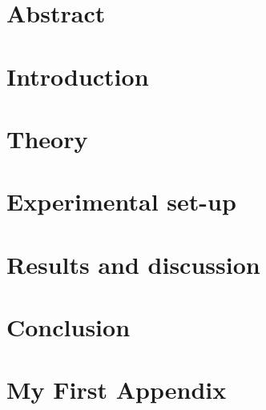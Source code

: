 \documentclass[a4paper,11pt,twoside]{report}
\author{\me}
\begin{document}


\normalsize

\chapter*{Abstract}\label{chapter:Abstract}
\setcounter{page}{0}


\tableofcontents

\chapter{Introduction}\label{chapter:Introduction}
\setcounter{page}{0}


\chapter{Theory}\label{chapter:Theory}


\chapter{Experimental set-up}\label{chapter:Experimental set-up}


\chapter{Results and discussion}\label{chapter:Results and discussion}


\chapter{Conclusion}\label{chapter:Conclusion}




\newpage

\appendix
{}
\chapter{My First Appendix}\label{chapter:Appendix A}

\end{document}
